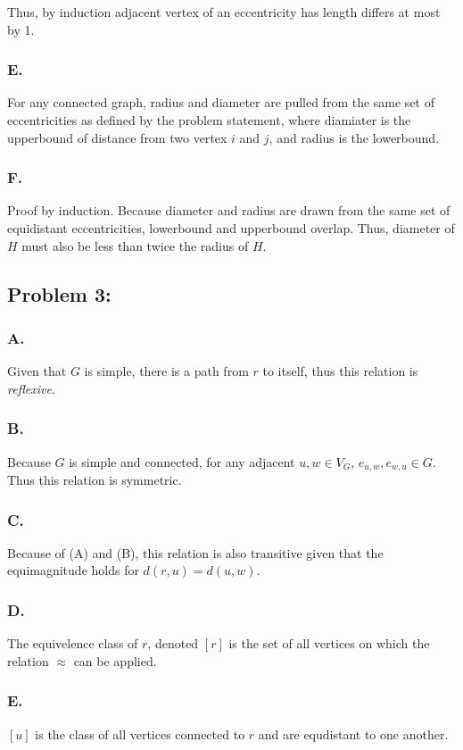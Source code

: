 \documentclass[12pt,letterpaper]{article}
\begin{document}
Thus, by induction adjacent vertex of an eccentricity has length differs at
most by 1.

\subsubsection*{E.} For any connected graph, radius and diameter are pulled
from the same set of eccentricities as defined by the problem statement, where
diamiater is the upperbound of distance from two vertex $i$ and $j$, and
radius is the lowerbound.

\subsubsection*{F.}
Proof by induction. Because diameter and radius are drawn from the same set of
equidistant eccentricities, lowerbound and upperbound overlap. Thus, diameter
of $H$ must also be less than twice the radius of $H$.

\subsection*{Problem 3:}

\subsubsection*{A.}
Given that $G$ is simple, there is a path from $r$ to itself, thus this
relation is \emph{reflexive}.

\subsubsection*{B.}
Because $G$ is simple and connected, for any adjacent $u, w \in V_G$, $e_{u,
w}, e_{w, u} \in G$. Thus this relation is symmetric.

\subsubsection*{C.}
Because of (A) and (B), this relation is also transitive given that the
equimagnitude holds for $d(r, u) = d(u, w)$.
 
\subsubsection*{D.}
The equivelence class of $r$, denoted $[r]$ is the set of all vertices on 
which the relation $\approx$ can be applied.

\subsubsection*{E.}
$[u]$ is the class of all vertices connected to $r$ and are equdistant to one
another.
\end{document}
